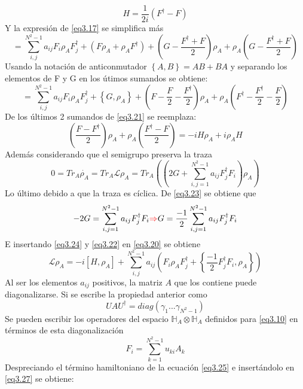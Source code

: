 \documentclass{book}
\begin{document}
\begin{equation}\label{eq3.19}  H=\frac{1}{2i}(F^\dag-F)\end{equation}
Y la expresión de \textcolor{blue}{\ref{eq3.17}} se simplifica más
\begin{equation}\label{eq3.20} =\sum_{i,j}^{N^2-1}a_{ij}F_i\rho_AF_j^\dag+(F\rho_A+\rho_AF^\dag)+(G-\frac{F^\dag+F}{2})\rho_A+\rho_A(G-\frac{F^\dag+F}{2})\end{equation}
Usando la notación de anticonmutador $\left\{A,B\right\}=AB+BA$ y separando los elementos de F y G en los útimos sumandos se obtiene:
\begin{equation}\label{eq3.21}=\sum_{i,j}^{N^2-1}a_{ij}F_i\rho_A F_j^\dag+\left\{G,\rho_A\right\}+(F-\frac{F}{2}-\frac{F^\dag}{2})\rho_A+\rho_A(F^\dag-\frac{F^\dag}{2}-\frac{F}{2})\end{equation}
De los últimos 2 sumandos de \textcolor{blue}{\ref{eq3.21}} se reemplaza:
\begin{equation}\label{eq3.22} (\frac{F-F^\dag}{2})\rho_A+\rho_A(\frac{F^\dag-F}{2})=-iH\rho_A+i\rho_AH\end{equation}
Además considerando que el semigrupo preserva la traza
\begin{equation} \label{eq3.23}0=Tr_A\dot{\rho_A}=Tr_A\mathcal{L}\rho_A=Tr_A((2G+\sum_{i,j=1}^{N^2-1}a_{ij}F_j^\dag F_i)\rho_A)\end{equation}
Lo último debido a que la traza es cíclica. De \textcolor{blue}{\ref{eq3.23}} se obtiene que
\begin{equation}\label{eq3.24}-2G=\sum_{i,j=1}^{N^2-1}a_{ij}F_j^\dag F_i \textcolor{red}{\Rightarrow} G=\frac{-1}{2}\sum_{i,j=1}^{N^2-1}a_{ij}F_j^\dag F_i\end{equation}
E insertando \textcolor{blue}{\ref{eq3.24}} y \textcolor{blue}{\ref{eq3.22}} en \textcolor{blue}{\ref{eq3.20}} se obtiene
\begin{equation}\label{eq3.25}\mathcal{L}\rho_A=-i[H,\rho_A]+\sum_{i,j}^{N^2-1}a_{ij}(F_i\rho_AF_j^\dag+\left\{\frac{-1}{2}F_j^\dag F_i,\rho_A\right\})\end{equation}
Al ser los elementos $a_{ij}$ positivos, la matriz $A$ que los contiene puede diagonalizarse. Si se escribe la propiedad anterior como
\begin{equation}\label{eq3.26} UAU^\dag=diag(\gamma_1...\gamma_{N^2-1})\end{equation}
Se pueden escribir los operadores del espacio $\mathbb{H}_A\otimes\mathbb{H}_A$ definidos para \textcolor{blue}{\ref{eq3.10}} en términos de esta diagonalización
\begin{equation}\label{eq3.27} F_i=\sum_{k=1}^{N^2-1}u_{ki}A_k\end{equation} Despreciando el término hamiltoniano de la ecuación \textcolor{blue}{\ref{eq3.25}} e insertándolo en \textcolor{blue}{\ref{eq3.27}} se obtiene:
\end{document}
